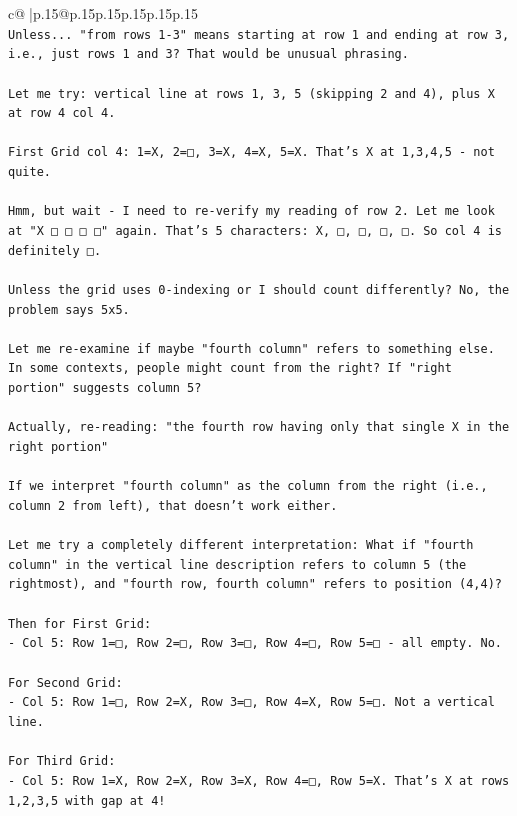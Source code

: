 \documentclass{article}
\begin{document}
{\begin{supertabular}{c@{$\;$}|p{.15\linewidth}@{}p{.15\linewidth}p{.15\linewidth}p{.15\linewidth}p{.15\linewidth}p{.15\linewidth}}
{{{\\ 
\texttt{Unless... "from rows 1{-}3" means starting at row 1 and ending at row 3, i.e., just rows 1 and 3? That would be unusual phrasing.} \\
\\ 
\texttt{Let me try: vertical line at rows 1, 3, 5 (skipping 2 and 4), plus X at row 4 col 4.} \\
\\ 
\texttt{First Grid col 4: 1=X, 2=□, 3=X, 4=X, 5=X. That's X at 1,3,4,5 {-} not quite.} \\
\\ 
\texttt{Hmm, but wait {-} I need to re{-}verify my reading of row 2. Let me look at "X □ □ □ □" again. That's 5 characters: X, □, □, □, □. So col 4 is definitely □.} \\
\\ 
\texttt{Unless the grid uses 0{-}indexing or I should count differently? No, the problem says 5x5.} \\
\\ 
\texttt{Let me re{-}examine if maybe "fourth column" refers to something else. In some contexts, people might count from the right? If "right portion" suggests column 5?} \\
\\ 
\texttt{Actually, re{-}reading: "the fourth row having only that single X in the right portion"} \\
\\ 
\texttt{If we interpret "fourth column" as the column from the right (i.e., column 2 from left), that doesn't work either.} \\
\\ 
\texttt{Let me try a completely different interpretation: What if "fourth column" in the vertical line description refers to column 5 (the rightmost), and "fourth row, fourth column" refers to position (4,4)?} \\
\\ 
\texttt{Then for First Grid: } \\
\texttt{{-} Col 5: Row 1=□, Row 2=□, Row 3=□, Row 4=□, Row 5=□ {-} all empty. No.} \\
\\ 
\texttt{For Second Grid:} \\
\texttt{{-} Col 5: Row 1=□, Row 2=X, Row 3=□, Row 4=X, Row 5=□. Not a vertical line.} \\
\\ 
\texttt{For Third Grid:} \\
\texttt{{-} Col 5: Row 1=X, Row 2=X, Row 3=X, Row 4=□, Row 5=X. That's X at rows 1,2,3,5 with gap at 4! } \\
}}}
\end{supertabular}}
\end{document}
